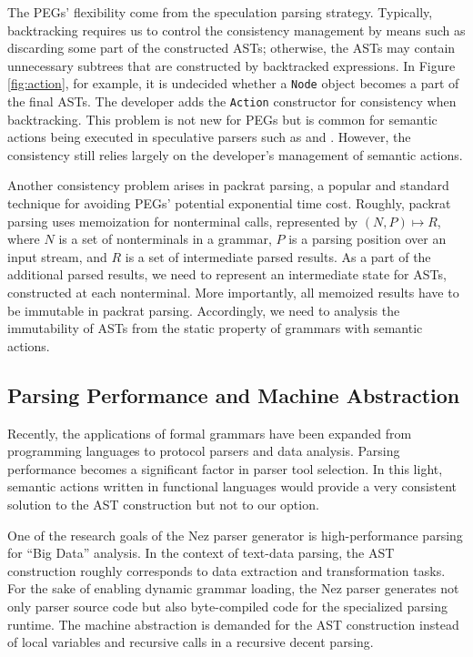 \documentclass[JIP]{ipsj}
\begin{document}
The PEGs' flexibility come from the speculation parsing strategy. Typically, backtracking requires us to control the consistency management by means such as discarding some part of the constructed ASTs; otherwise, the ASTs may contain unnecessary subtrees that are constructed by backtracked expressions. In Figure \ref{fig:action}, for example, it is undecided whether a {\tt Node} object becomes a part of the final ASTs. The developer adds the {\tt Action} constructor for consistency when backtracking.  This problem is not new for PEGs but is common for semantic actions being executed in speculative parsers such as \cite{PPPJ03_Elkhound} and \cite{LDTA11_SemanticAction}. However, the consistency  still relies largely on the developer's management of semantic actions. 

Another consistency problem arises in packrat parsing\cite{ICFP02_PackratParsing}, a popular and standard technique for avoiding  PEGs' potential exponential time cost. Roughly, packrat parsing uses memoization for nonterminal calls, represented by $(N, P) \mapsto R$, where $N$ is a set of nonterminals in a grammar, $P$ is a parsing position over an input stream, and $R$ is a set of intermediate parsed results. As a part of the additional parsed results, we need to represent an intermediate state for ASTs, constructed at each nonterminal. More importantly, all memoized results have to be immutable in packrat parsing. Accordingly, we need to analysis the immutability of ASTs from the static property of grammars with semantic actions.

\subsection{Parsing Performance and Machine Abstraction}

Recently, the applications of formal grammars have been expanded from programming languages to protocol parsers and data analysis\cite{IMC06_Binpac,WWW06_XMLScreamer,OOPSLA14_ParserCombinator}. Parsing performance becomes a significant factor in  parser tool selection. In this light, semantic actions written in functional languages would provide a very consistent solution to the AST construction but not to our option.

One of the research goals of the Nez parser generator is high-performance parsing for ``Big Data'' analysis. 
In the context of text-data parsing, the AST construction roughly corresponds to data extraction and transformation tasks. 
For the sake of enabling dynamic grammar loading, the Nez parser generates not only parser source code but also byte-compiled code for the specialized parsing runtime. The machine abstraction is demanded for the AST construction instead of local variables and recursive calls in a recursive decent parsing.
\end{document}
